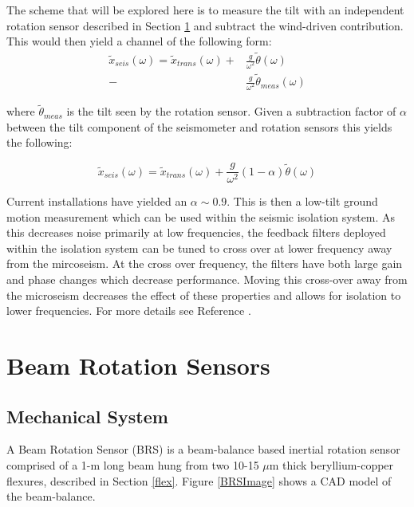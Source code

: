\documentclass [12pt, proquest]{uwthesis}[2019]
\begin{document}
The scheme that will be explored here is to measure the tilt with an independent rotation sensor described in Section \ref{BRSSec} and subtract the wind-driven contribution. This would then yield a channel of the following form:
\begin{align}
\tilde{x}_{seis}(\omega)=\tilde{x}_{trans}(\omega)+&\frac{g}{\omega^2}\tilde{\theta}(\omega)\\
-&\frac{g}{\omega^2}\tilde{\theta}_{meas}(\omega)
\end{align}

where $\tilde{\theta}_{meas}$ is the tilt seen by the rotation sensor. Given a subtraction factor of $\alpha$ between the tilt component of the seismometer and rotation sensors this yields the following:

\[\tilde{x}_{seis}(\omega)=\tilde{x}_{trans}(\omega)+\frac{g}{\omega^2}(1-\alpha)\tilde{\theta}(\omega)\]

Current installations have yielded an $\alpha\sim 0.9$. This is then a low-tilt ground motion measurement which can be used within the seismic isolation system. As this decreases noise primarily at low frequencies, the feedback filters deployed within the isolation system can be tuned to cross over at lower frequency away from the mircoseism. At the cross over frequency, the filters have both large gain and phase changes which decrease performance. Moving this cross-over away from the microseism decreases the effect of these properties and allows for isolation to lower frequencies. For more details see Reference \cite{windproofing}.

\section{Beam Rotation Sensors} \label{BRSSec}
\subsection{Mechanical System}

\quad A Beam Rotation Sensor (BRS) is a beam-balance based inertial rotation sensor comprised of a 1-m long beam hung from two 10-15 $\mu$m thick beryllium-copper flexures, described in Section \ref{flex}. Figure \ref{BRSImage} shows a CAD model of the beam-balance. 
\end{document}
